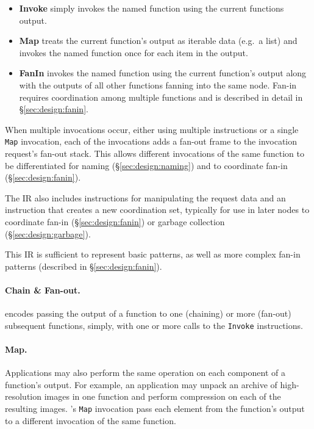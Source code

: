 \begin{itemize}
  \item \textbf{Invoke} simply invokes the named function using the
        current functions output.
  \item \textbf{Map} treats the current function's output as iterable data
        (e.g.\ a list) and invokes the named function once for each item in the
        output.
  \item \textbf{FanIn} invokes the named function using the current function's
        output along with the outputs of all other functions fanning into the
        same node. Fan-in requires coordination among multiple functions and is
        described in detail in \S\ref{sec:design:fanin}.
\end{itemize}

When multiple invocations occur, either using multiple instructions or a single
\texttt{Map} invocation, each of the invocations adds a fan-out frame to the
invocation request's fan-out stack. This allows different invocations of the
same function to be differentiated for naming (\S\ref{sec:design:naming}) and to
coordinate fan-in (\S\ref{sec:design:fanin}).

The IR also includes instructions for manipulating the \name{} request data and
an instruction that creates a new coordination set, typically for use in later
nodes to coordinate fan-in (\S\ref{sec:design:fanin}) or garbage collection
(\S\ref{sec:design:garbage}).

This IR is sufficient to represent basic patterns, as well as more complex
fan-in patterns (described in \S\ref{sec:design:fanin}).

\paragraph{Chain \& Fan-out.}
\name{} encodes passing the output of a function to one (chaining) or more
(fan-out) subsequent functions, simply, with one or more calls to the
\texttt{Invoke} instructions.

\paragraph{Map.}
Applications may also perform the same operation on each component of a
function's output. For example, an application may unpack an archive of
high-resolution images in one function and perform compression on each of the
resulting images. \name{}'s \texttt{Map} invocation pass each element from the
function's output to a different invocation of the same function.

